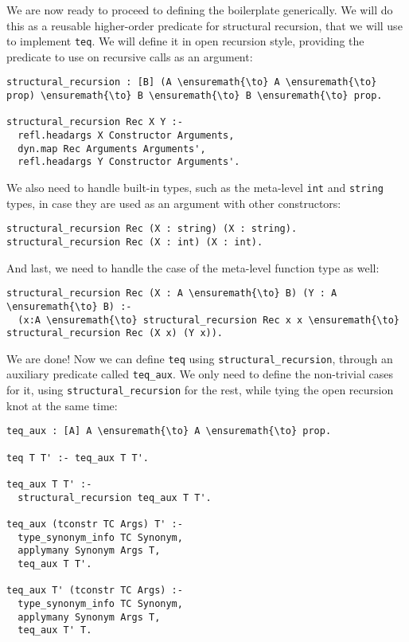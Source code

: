 We are now ready to proceed to defining the boilerplate generically. We
will do this as a reusable higher-order predicate for structural
recursion, that we will use to implement \texttt{teq}. We will define it
in open recursion style, providing the predicate to use on recursive
calls as an argument:

\begin{verbatim}
structural_recursion : [B] (A \ensuremath{\to} A \ensuremath{\to} prop) \ensuremath{\to} B \ensuremath{\to} B \ensuremath{\to} prop.

structural_recursion Rec X Y :-
  refl.headargs X Constructor Arguments,
  dyn.map Rec Arguments Arguments',
  refl.headargs Y Constructor Arguments'.
\end{verbatim}

We also need to handle built-in types, such as the meta-level
\texttt{int} and \texttt{string} types, in case they are used as an
argument with other constructors:

\begin{verbatim}
structural_recursion Rec (X : string) (X : string).
structural_recursion Rec (X : int) (X : int).
\end{verbatim}

And last, we need to handle the case of the meta-level function type as
well:

\begin{verbatim}
structural_recursion Rec (X : A \ensuremath{\to} B) (Y : A \ensuremath{\to} B) :-
  (x:A \ensuremath{\to} structural_recursion Rec x x \ensuremath{\to} structural_recursion Rec (X x) (Y x)).
\end{verbatim}

We are done! Now we can define \texttt{teq} using
\texttt{structural\_recursion}, through an auxiliary predicate called
\texttt{teq\_aux}. We only need to define the non-trivial cases for it,
using \texttt{structural\_recursion} for the rest, while tying the open
recursion knot at the same time:

\begin{verbatim}
teq_aux : [A] A \ensuremath{\to} A \ensuremath{\to} prop.

teq T T' :- teq_aux T T'.

teq_aux T T' :-
  structural_recursion teq_aux T T'.

teq_aux (tconstr TC Args) T' :-
  type_synonym_info TC Synonym,
  applymany Synonym Args T,
  teq_aux T T'.

teq_aux T' (tconstr TC Args) :-
  type_synonym_info TC Synonym,
  applymany Synonym Args T,
  teq_aux T' T.
\end{verbatim}

